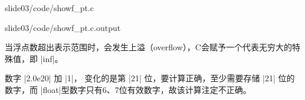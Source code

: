 \begin{frame}[fragile]
  
  {slide03/code/showf_pt.c}
  \pause
  
  
  {slide03/code/showf_pt.c.output}
  
\end{frame}
\begin{frame}[fragile]
  
  \pause 
  
  \pause
  \begin{free}[注]{}
    当浮点数超出表示范围时，会发生上溢（overflow），C会赋予一个代表无穷大的特殊值，即 \lst|inf|。
  \end{free}

\end{frame}
%
\begin{frame}[fragile]
  
  \pause
  

  \pause

  \begin{free}[解释]{}
    数字 \lst|2.0e20| 加 \lst|1|， 变化的是第 \lst|21| 位，要计算正确，至少需要存储 \lst|21| 位的数字，而 \lst|float|型数字只有6、7位有效数字，故该计算注定不正确。    
  \end{free}

\end{frame}
%
%
%
